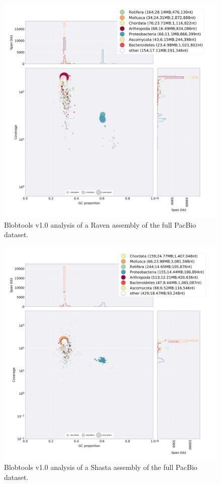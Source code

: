   \begin{figure}[ht]
    \centering
     \includegraphics[width=15cm]{fig/benchmark/PB_RAVEN.png}
   \caption{Blobtools v1.0 analysis of a Raven assembly of the full PacBio dataset.}
   \label{fig:blobtools_raven_pb}
 \end{figure}
 
  \begin{figure}[ht]
    \centering
     \includegraphics[width=15cm]{fig/benchmark/PB_SHASTA.png}
   \caption{Blobtools v1.0 analysis of a Shasta assembly of the full PacBio dataset.}
   \label{fig:blobtools_shasta_pb}
 \end{figure}

